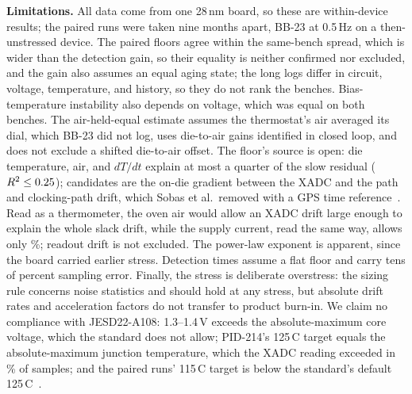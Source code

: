 \documentclass[10pt,twocolumn]{article}
\newcommand{\degC}{\,\textdegree C}
\begin{document}
\textbf{Limitations.} All data come from one 28\,nm board, so these are within-device results; the paired runs were taken nine months apart, BB-23 at 0.5\,Hz on a then-unstressed device. The paired floors agree within the same-bench spread, which is wider than the detection gain, so their equality is neither confirmed nor excluded, and the gain also assumes an equal aging state; the long logs differ in circuit, voltage, temperature, and history, so they do not rank the benches. Bias-temperature instability also depends on voltage, which was equal on both benches. The air-held-equal estimate assumes the thermostat's air averaged its dial, which BB-23 did not log, uses die-to-air gains identified in closed loop, and does not exclude a shifted die-to-air offset. The floor's source is open: die temperature, air, and $dT/dt$ explain at most a quarter of the slow residual ($R^2\le0.25$); candidates are the on-die gradient between the XADC and the path and clocking-path drift, which Sobas et al.\ removed with a GPS time reference~\cite{sobas}. Read as a thermometer, the oven air would allow an XADC drift large enough to explain the whole slack drift, while the supply current, read the same way, allows only \vThermoShare\%; readout drift is not excluded. The power-law exponent is apparent, since the board carried earlier stress. Detection times assume a flat floor and carry tens of percent sampling error. Finally, the stress is deliberate overstress: the sizing rule concerns noise statistics and should hold at any stress, but absolute drift rates and acceleration factors do not transfer to product burn-in. We claim no compliance with JESD22-A108: 1.3--1.4\,V exceeds the absolute-maximum core voltage, which the standard does not allow; PID-214's 125\degC{} target equals the absolute-maximum junction temperature, which the XADC reading exceeded in \vTjAbovePct\% of samples; and the paired runs' 115\degC{} target is below the standard's default 125\degC~\cite{jedec}.

\end{document}
